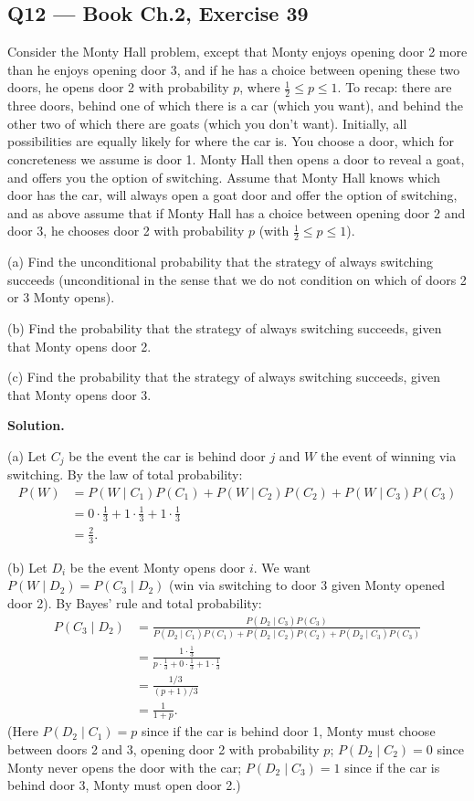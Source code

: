 \documentclass[11pt]{article}
\begin{document}
\subsection*{Q12 --- Book Ch.2, Exercise 39}
\begin{qbox}
Consider the Monty Hall problem, except that Monty enjoys opening door 2 more than he enjoys opening door 3, and if he has a choice between opening these two doors, he opens door 2 with probability $p$, where $\frac12 \leq p \leq 1$.
To recap: there are three doors, behind one of which there is a car (which you want), and behind the other two of which there are goats (which you don't want). Initially, all possibilities are equally likely for where the car is. You choose a door, which for concreteness we assume is door 1. Monty Hall then opens a door to reveal a goat, and offers you the option of switching. Assume that Monty Hall knows which door has the car, will always open a goat door and offer the option of switching, and as above assume that if Monty Hall has a choice between opening door 2 and door 3, he chooses door 2 with probability $p$ (with $\frac12 \leq p \leq 1$).

(a) Find the unconditional probability that the strategy of always switching succeeds (unconditional in the sense that we do not condition on which of doors 2 or 3 Monty opens).

(b) Find the probability that the strategy of always switching succeeds, given that Monty opens door 2.

(c) Find the probability that the strategy of always switching succeeds, given that Monty opens door 3.
\end{qbox}
\textbf{Solution.}

(a) Let $C_j$ be the event the car is behind door $j$ and $W$ the event of winning via switching. By the law of total probability:
\begin{align*}
P(W) &= P(W\mid C_1)P(C_1) + P(W\mid C_2)P(C_2) + P(W\mid C_3)P(C_3) \\
&= 0\cdot\frac13 + 1\cdot\frac13 + 1\cdot\frac13 \\
&= \frac{2}{3}.
\end{align*}

(b) Let $D_i$ be the event Monty opens door $i$. We want $P(W\mid D_2) = P(C_3\mid D_2)$ (win via switching to door 3 given Monty opened door 2). By Bayes' rule and total probability:
\begin{align*}
P(C_3\mid D_2) &= \frac{P(D_2\mid C_3)P(C_3)}{P(D_2\mid C_1)P(C_1) + P(D_2\mid C_2)P(C_2) + P(D_2\mid C_3)P(C_3)} \\
&= \frac{1 \cdot \tfrac13}{p\cdot\tfrac13 + 0\cdot\tfrac13 + 1\cdot\tfrac13} \\
&= \frac{1/3}{(p+1)/3} \\
&= \frac{1}{1+p}.
\end{align*}
(Here $P(D_2\mid C_1) = p$ since if the car is behind door 1, Monty must choose between doors 2 and 3, opening door 2 with probability $p$; $P(D_2\mid C_2)=0$ since Monty never opens the door with the car; $P(D_2\mid C_3)=1$ since if the car is behind door 3, Monty must open door 2.)
\end{document}
